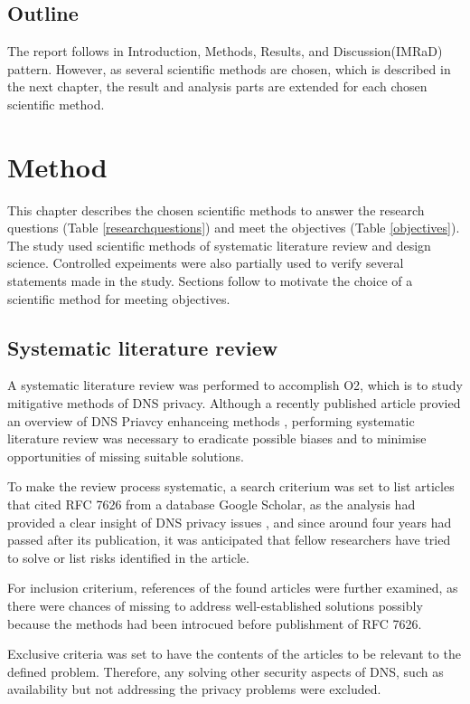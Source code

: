 \documentclass[a4paper,12pt]{article}
\begin{document}
\subsection{Outline}
The report follows in Introduction, Methods, Results, and Discussion(IMRaD) pattern. However, as several scientific methods are chosen, which is described in the next chapter, the result and analysis parts are extended for each chosen scientific method. 

\newpage
\section{Method}\label{Method}
This chapter describes the chosen scientific methods to answer the research questions (Table \ref{researchquestions}) and meet the objectives (Table \ref{objectives}).
The study used scientific methods of systematic literature review and design science. Controlled expeiments were also partially used to verify several statements made in the study. Sections follow to motivate the choice of a scientific method for meeting objectives.
\subsection{Systematic literature review}
A systematic literature review was performed to accomplish O2, which is to study mitigative methods of DNS privacy. Although a recently published article provied an overview of DNS Priavcy enhanceing methods \cite{van2018privacy}, performing systematic literature review was necessary to eradicate possible biases and to minimise opportunities of missing suitable solutions.

To make the review process systematic, a search criterium was set to list articles that cited RFC 7626 from a database Google Scholar, as the analysis had provided a clear insight of DNS privacy issues \cite{rfc7626}, and since around four years had passed after its publication, it was anticipated that fellow researchers have tried to solve or list risks identified in the article.

For inclusion criterium, references of the found articles were further examined, as there were chances of missing to address well-established solutions possibly because the methods had been introcued before publishment of RFC 7626.

Exclusive criteria was set to have the contents of the articles to be relevant to the defined problem. Therefore, any solving other security aspects of DNS, such as availability but not addressing the privacy problems were excluded.
\end{document}
